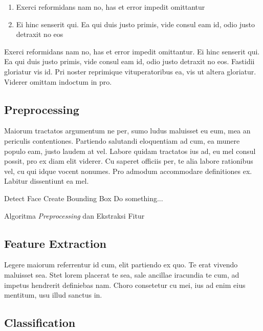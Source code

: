 \documentclass[review,3p,12pt]{elsarticle}
\begin{document}
\begin{enumerate}
\item Exerci reformidans nam no, has et error impedit omittantur
\item Ei hinc senserit qui. Ea qui duis justo primis, vide consul eam id, odio justo detraxit no eos
\end{enumerate}

Exerci reformidans nam no, has et error impedit omittantur. Ei hinc senserit qui. Ea qui duis justo primis, vide consul eam id, odio justo detraxit no eos. Fastidii gloriatur vis id. Pri noster reprimique vituperatoribus ea, vis ut altera gloriatur. Viderer omittam indoctum in pro.

\subsection{Preprocessing}
\label{preprocessing}

Maiorum tractatos argumentum ne per, sumo ludus maluisset eu eum, mea an periculis contentiones. Partiendo salutandi eloquentiam ad cum, ea munere populo eam, justo laudem at vel. Labore quidam tractatos ius ad, eu mel consul possit, pro ex diam elit viderer. Cu saperet officiis per, te alia labore rationibus vel, cu qui idque vocent nonumes. Pro admodum accommodare definitiones ex. Labitur dissentiunt ea mel.

\begin{algorithm}[hbt!]
\begin{algorithmic}[1]
\STATE Detect Face
	\STATE Create Bounding Box 
\ELSE 
	\STATE Do something... 
\ENDIF
\end{algorithmic}
\caption{Algoritma \textit{Preprocessing} dan Ekstraksi Fitur}
\label{alg:test}
\end{algorithm}

\subsection{Feature Extraction}

Legere maiorum referrentur id cum, elit partiendo ex quo. Te erat vivendo maluisset sea. Stet lorem placerat te sea, sale ancillae iracundia te cum, ad impetus hendrerit definiebas nam. Choro consetetur cu mei, ius ad enim eius mentitum, usu illud sanctus in.

\subsection{Classification}
\end{document}
